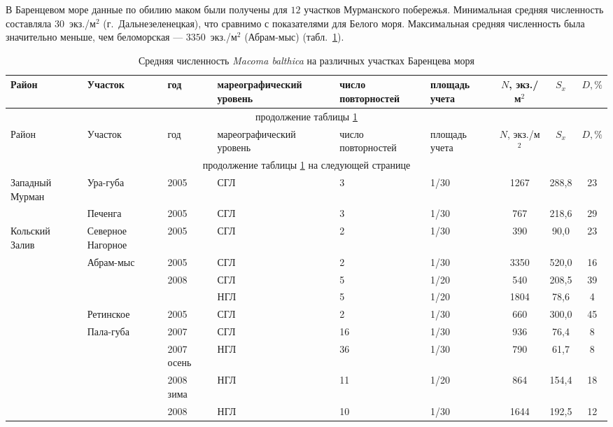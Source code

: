 В Баренцевом море данные по обилию маком были получены для $12$ участков Мурманского побережья.
Минимальная средняя численность составляла $30$~экз./м$^2$ (г.~Дальнезеленецкая), что сравнимо с показателями для Белого моря. 
Максимальная средняя численность была значительно меньше, чем беломорская --- $3350$~экз./м$^2$ (Абрам-мыс) (табл.~\ref{tab:mean_N_Barents}). 
	\begin{footnotesize}
	\begin{longtable}{|p{2cm}|p{3cm}|p{1cm}|p{2cm}|p{1.5cm}|p{1cm}|*{3}{c|}}
	\caption{Средняя численность {\it Macoma balthica} на различных участках Баренцева моря}\label{tab:mean_N_Barents}\\
	\hline
	Район & Участок & год & ма\-ре\-ографи\-ческий уровень & число повторностей & площадь учета & $N$, экз./м$^2$ & $S_x$  & $D, \%$ 
	\\ \hline \endfirsthead
	\hline
	\multicolumn{9}{|c|}{продолжение таблицы \ref{tab:mean_N_Barents}} \\ \hline
	Район & Участок & год & ма\-ре\-ографи\-ческий уровень & число повторностей & площадь учета & $N$, экз./м$^2$ & $S_x$  & $D, \%$ 
	\\ \hline \endhead
	\hline 
	\multicolumn{9}{|c|}{продолжение таблицы \ref{tab:mean_N_Barents} на следующей странице}
	\\ \hline \endfoot
	\endlastfoot
	Западный Мурман & Ура-губа & 2005 & СГЛ & 3 & 1/30 & 1267 & 288,8 & 23
		\\ \cline{2-9}
		 & Печенга & 2005 & СГЛ & 3 & 1/30 & 767 & 218,6 & 29
		\\ \hline
	Кольский Залив & Северное Нагорное & 2005 & СГЛ & 2 & 1/30 & 390 & 90,0 & 23
		\\ \cline{2-9}
		 & Абрам-мыс & 2005 & СГЛ & 2 & 1/30 & 3350 & 520,0 & 16
		\\ \cline{3-9}
		 &  & 2008 & СГЛ & 5 & 1/20 & 540 & 208,5 & 39
		\\ \cline{4-9}
		 &  &  & НГЛ & 5 & 1/20 & 1804 & 78,6 & 4
		\\ \cline{2-9}
		 & Ретинское & 2005 & СГЛ & 2 & 1/30 & 660 & 300,0 & 45
		\\ \cline{2-9}
		 & Пала-губа & 2007 & СГЛ & 16 & 1/30 & 936 & 76,4 & 8
		\\ \cline{3-9}
		 &  & 2007 осень & НГЛ & 36 & 1/30 & 790 & 61,7 & 8
		\\ \cline{3-9}
		 &  & 2008 зима & НГЛ & 11 & 1/20 & 864 & 154,4 & 18
		\\ \cline{3-9}
		 &  & 2008 & НГЛ & 10 & 1/30 & 1644 & 192,5 & 12
		\\ \hline

\end{longtable}
\end{footnotesize}

